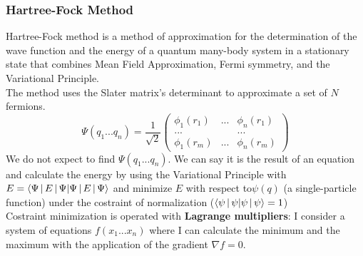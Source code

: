 \subsubsection{Hartree-Fock Method}
Hartree-Fock method is a method of approximation for the determination of the wave function and the energy of a quantum many-body system in a stationary state that combines Mean Field Approximation, Fermi symmetry, and the Variational Principle.\\
The method uses the Slater matrix's determinant to approximate a set of $N$ fermions.
\[
\Psi(q_1...q_n)=\frac{1}{\sqrt{2}}
\begin{pmatrix}
\phi_1(r_1)&...&\phi_n(r_1)\\
... & &...\\
\phi_1(r_m)&...&\phi_n(r_m)
\end{pmatrix}
\]
We do not expect to find $\Psi(q_1...q_n)$.
We can say it is the result of an equation and calculate the energy by using the Variational Principle with $E=\braket{\Psi\,|\,E\,|\,\Psi}$ and minimize $E$ with respect to$\psi(q)$ (a single-particle function) under the costraint of normalization ($\braket{\psi\,|\,\psi}=1$)\\
Costraint minimization is operated with \textbf{Lagrange multipliers}: I consider a system of equations $f(x_1...x_n)$ where I can calculate the minimum and the maximum with the application of the gradient $\nabla f=0$.\\

